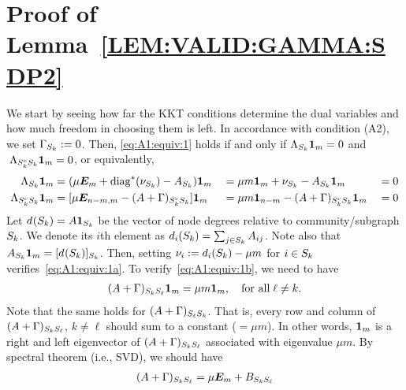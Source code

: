  



\section{Proof of Lemma~\ref{LEM:VALID:GAMMA:SDP2}}\label{sec:proof:valid:Gamma:SDP2}
We start by seeing how far the KKT conditions determine the dual variables and how much freedom in choosing them is left. In accordance with condition (A2), we set $\Gamma_{S_{k}} := 0$.
Then, \eqref{eq:A1:equiv:1} holds if and only if $\Lambda_{S_{k}} \bm{1}_m = 0$ and $ \;\Lambda_{S_{k}^cS_{k}} \bm{1}_m = 0$, or equivalently,
\begin{alignat}{4}
\label{eq:A1:equiv:1a}
  \Lambda_{S_{k}} \bm{1}_m 
    &= (\mu  \bm{E}_m + \operatorname{diag}^*(\nu_{S_{k}})- A_{S_{k}} ) \bm{1}_m 
    &&= \mu m \bm{1}_m + \nu_{S_{k}} - A_{S_k} \bm{1}_m  
    &&= 0\\
\label{eq:A1:equiv:1b}
  \Lambda_{S_{k}^cS_{k}} \bm{1}_m 
    &= [\mu \bm{E}_{n-m,m} - (A+\Gamma)_{S_{k}^cS_{k}}] \bm{1}_m 
    &&= \mu m \bm{1}_{n-m} - (A+\Gamma)_{S_{k}^cS_{k}} \bm{1}_m 
    &&= 0
\end{alignat}
Let $d_{}(S_{k}) = A \bm{1}_{S_{k}}$ be the vector of node degrees relative to community/subgraph $S_{k}$. We denote its $i$th element as $d_{i}(S_{k}) = \sum_{j \in S_{k}} A_{ij}$. Note also that $A_{S_k}\bm{1}_m = [d_{}(S_{k})]_{S_{k}}$.
Then, setting $\nu_i :=   d_{i}(S_{k}) - \mu m$ for $i \in S_{k}$ 
verifies~\eqref{eq:A1:equiv:1a}. To verify~\eqref{eq:A1:equiv:1b}, we need to have
\begin{align}
  (A+\Gamma)_{S_{k}S_{\ell}} \bm{1}_m = \mu m \bm{1}_m, \quad \text{for all}\;\ell \neq k.
  \label{eq:Gamma:row:sum:cond}
\end{align}
Note that the same holds for $(A+\Gamma)_{S_{\ell}S_{k}}$. That is, every row and column of $(A+\Gamma)_{S_{k}S_{\ell}}$, $k\neq \ell$ should sum to a constant ($= \mu m$). 
In other words, $\bm{1}_m$ is a right and left eigenvector of $(A+\Gamma)_{S_{k}S_{\ell}}$ associated with eigenvalue $\mu m$. By spectral theorem (i.e., SVD), we should have
\begin{align}\label{eq:B:def:SDP2}
  (A+\Gamma)_{S_{k}S_{\ell}} = \mu \bm{E}_m + B_{S_{k}S_{\ell}} 
\end{align}
